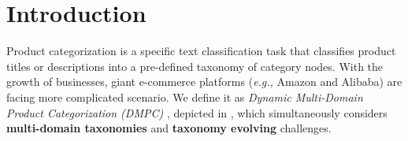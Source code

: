 \section{Introduction}

Product categorization \cite{ding2002goldenbullet} is a specific text classification task that classifies product titles or descriptions into a pre-defined taxonomy of category nodes.
With the growth of businesses, 
giant e-commerce platforms (\textit{e.g.,} Amazon and Alibaba) are facing more complicated scenario. We define it as \textit{Dynamic Multi-Domain Product Categorization (DMPC)} 
, depicted in , which simultaneously considers \textbf{multi-domain taxonomies} and \textbf{taxonomy evolving} challenges.


